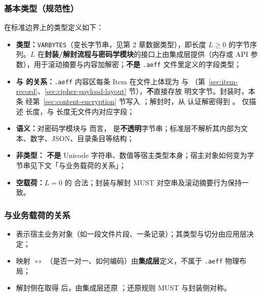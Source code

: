 \subsubsection{基本类型（规范性）}\label{sec:item-payload-type}

 在标准边界上的类型定义如下：

\begin{itemize}
  \item \textbf{类型：}\texttt{VARBYTES}（变长字节串，见第 2 章数据类型），即长度 $L \ge 0$ 的字节序列。$L$ 在\textbf{封装/解封流程与密码学模块}的接口上由集成层提供（内存或 API 参数），用于滚动摘要与内容加解密；\textbf{不是} \texttt{.aeff} 文件里定义的字段类型；
  \item \textbf{与  的关系：}\texttt{.aeff} 内容区每条 Item 在文件上体现为  与 （第~\ref{sec:item-record}、\ref{sec:cipher-payload-layout} 节），\textbf{不}直接存放  明文字节。封装时，本条  经第~\ref{sec:content-encryption} 节写入 ；解封时，从  认证解密得到 。 仅描述  长度，与  长度无文件内对应字段；
  \item \textbf{语义：}对密码学模块与  而言， 是\textbf{不透明}字节串；标准层不解析其内部为文本、数字、JSON、目录条目等结构；
  \item \textbf{非类型：} \textbf{不是} Unicode 字符串、数值等宿主类型本身；宿主对象如何变为字节串见下文「与业务载荷的关系」；
  \item \textbf{空载荷：}$L = 0$ 的  合法；封装与解封 MUST 对空串及滚动摘要行为保持一致。
\end{itemize}

\subsubsection{与业务载荷的关系}

\begin{itemize}
  \item {} 表示宿主业务对象（如一段文件片段、一条记录）；其类型与切分由应用层决定；
  \item 映射  $\leftrightarrow$ （是否一对一、如何编码）由\textbf{集成层}定义，不属于 \texttt{.aeff} 物理布局；
  \item 解封侧在取得  后，由集成层还原 ；还原规则 MUST 与封装侧对称。
\end{itemize}

